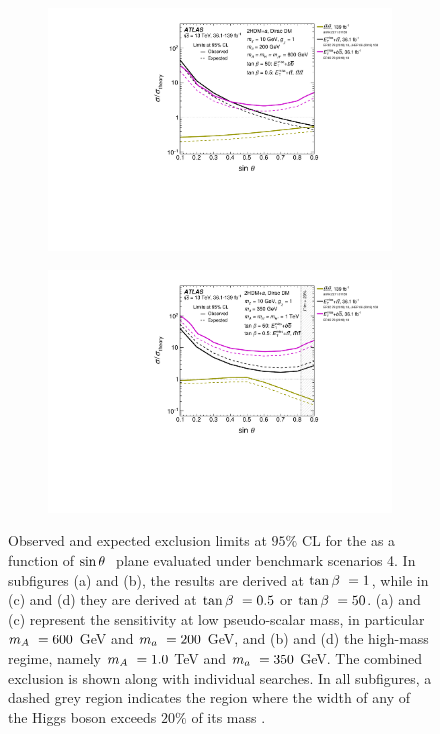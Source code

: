 \begin{figure}[h!]
\begin{subfigure}[2]{0.495\textwidth}
        \includegraphics[width=\linewidth]{figures/fig_07c.pdf}
        \caption{}
        \label{fig:result-sint-scan-c}
    \end{subfigure}
    \begin{subfigure}[2]{0.495\textwidth}
        \centering
        \includegraphics[width=\linewidth]{figures/fig_07d.pdf}
        \caption{}
        \label{fig:result-sint-scan-d}
    \end{subfigure}
    \caption{Observed and expected exclusion limits at $95\%$ CL for the \thdma as a function of $\sin\theta~$ plane evaluated under benchmark scenarios 4. In subfigures (a) and (b), the results are derived at $\tan\beta~=1$, while in (c) and (d) they are derived at $\tan\beta~=0.5$ or $\tan\beta~=50$. (a) and (c) represent the sensitivity at low pseudo-scalar mass, in particular $m_A~=600$ GeV and $m_a~=200$ GeV, and (b) and (d) the high-mass regime, namely $m_A~=1.0$ TeV and $m_a~=350$ GeV. The combined exclusion is shown along with individual searches. In all subfigures, a dashed grey region indicates the region where the width of any of the Higgs boson exceeds $20\%$ of its mass \cite{2hdma_comb}. }
    \label{fig:result-sint-scan}
\end{figure} 

